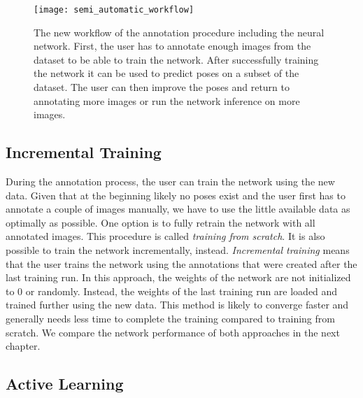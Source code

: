 \begin{figure}[!tbp]
	\centering
    \texttt{[image: semi\_automatic\_workflow]}
    \caption{The new workflow of the annotation procedure including the neural network. First, the user has to annotate enough images from the dataset to be able to train the network. After successfully training the network it can be used to predict poses on a subset of the dataset. The user can then improve the poses and return to annotating more images or run the network inference on more images.}
    	\label{fig:semi_automatic_workflow}
\end{figure}

\subsection{Incremental Training} \label{subsection:online_learning}

During the annotation process, the user can train the network using the new data. Given that at the beginning likely no poses exist and the user first has to annotate a couple of images manually, we have to use the little available data as optimally as possible. One option is to fully retrain the network with all  annotated images. This procedure is called \textit{training from scratch}. It is also possible to train the network incrementally, instead. \textit{Incremental training} means that the user trains the network using the annotations that were created after the last training run. In this approach, the weights of the network are not initialized to 0 or randomly. Instead, the weights of the last training run are loaded and trained further using the new data. This method is likely to converge faster and generally needs less time to complete the training compared to training from scratch. We compare the network performance of both approaches in the next chapter.

\subsection{Active Learning} \label{subsection:active_learning}

